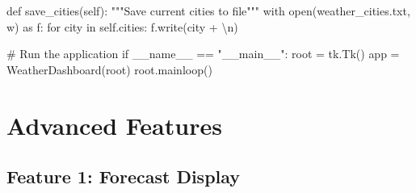 \documentclass[
  letterpaper,
  DIV=11,
  numbers=noendperiod,
  oneside]{scrreprt}
\newenvironment{Shaded}{}{}
\newcommand{\BuiltInTok}[1]{\textcolor[rgb]{0.84,0.23,0.29}{#1}}
\newcommand{\CharTok}[1]{\textcolor[rgb]{0.01,0.18,0.38}{#1}}
\newcommand{\CommentTok}[1]{\textcolor[rgb]{0.42,0.45,0.49}{#1}}
\newcommand{\ControlFlowTok}[1]{\textcolor[rgb]{0.84,0.23,0.29}{#1}}
\newcommand{\ImportTok}[1]{\textcolor[rgb]{0.01,0.18,0.38}{#1}}
\newcommand{\KeywordTok}[1]{\textcolor[rgb]{0.84,0.23,0.29}{#1}}
\newcommand{\NormalTok}[1]{\textcolor[rgb]{0.14,0.16,0.18}{#1}}
\newcommand{\OperatorTok}[1]{\textcolor[rgb]{0.14,0.16,0.18}{#1}}
\newcommand{\StringTok}[1]{\textcolor[rgb]{0.01,0.18,0.38}{#1}}
\newcommand{\VariableTok}[1]{\textcolor[rgb]{0.89,0.38,0.04}{#1}}
\begin{document}
\begin{Shaded}
\begin{Highlighting}[]
    \KeywordTok{def}\NormalTok{ save\_cities(}\VariableTok{self}\NormalTok{):}
        \CommentTok{"""Save current cities to file"""}
        \ControlFlowTok{with} \BuiltInTok{open}\NormalTok{(}\StringTok{\textquotesingle{}weather\_cities.txt\textquotesingle{}}\NormalTok{, }\StringTok{\textquotesingle{}w\textquotesingle{}}\NormalTok{) }\ImportTok{as}\NormalTok{ f:}
            \ControlFlowTok{for}\NormalTok{ city }\KeywordTok{in} \VariableTok{self}\NormalTok{.cities:}
\NormalTok{                f.write(city }\OperatorTok{+} \StringTok{\textquotesingle{}}\CharTok{\textbackslash{}n}\StringTok{\textquotesingle{}}\NormalTok{)}

\CommentTok{\# Run the application}
\ControlFlowTok{if} \VariableTok{\_\_name\_\_} \OperatorTok{==} \StringTok{"\_\_main\_\_"}\NormalTok{:}
\NormalTok{    root }\OperatorTok{=}\NormalTok{ tk.Tk()}
\NormalTok{    app }\OperatorTok{=}\NormalTok{ WeatherDashboard(root)}
\NormalTok{    root.mainloop()}
\end{Highlighting}
\end{Shaded}

\section{Advanced Features}\label{advanced-features-1}

\subsection{Feature 1: Forecast
Display}\label{feature-1-forecast-display}
\end{document}
